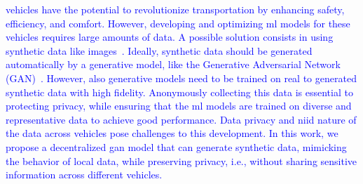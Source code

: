 %



\textcolor{blue}{
 vehicles have the potential to revolutionize transportation by enhancing safety, efficiency, and comfort.  However, developing and optimizing \gls*{ml} models for these vehicles requires large amounts of data. A possible solution consists in using synthetic data like images~\cite{Li2023Parallel}. Ideally, synthetic data should be generated automatically by a generative model, like the Generative Adversarial Network (GAN)~\cite{goodfellow_generative_2014}. However, also generative models need to be trained on real to generated synthetic data with high fidelity. Anonymously collecting this data is essential to protecting privacy, while ensuring that the \gls*{ml} models are trained on diverse and representative data to achieve good performance.
Data privacy and \gls*{niid} nature of the data across vehicles pose challenges to this development. In this work, we propose a decentralized \gls*{gan} model that can generate synthetic data, mimicking the behavior of local data, while preserving privacy, i.e.,  without sharing sensitive information across different vehicles.}

